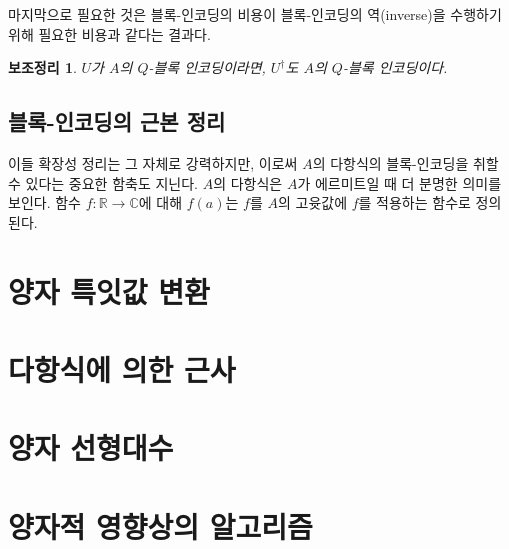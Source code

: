 \documentclass[a4paper,atbegshi,chapter,]{oblivoir}
\newtheorem{lemm}{보조정리}[chapter]
\begin{document}
마지막으로 필요한 것은 블록-인코딩의 비용이 블록-인코딩의 역(inverse)을
수행하기 위해 필요한 비용과 같다는 결과다.
\begin{lemm}
  $U$가 $A$의 $Q$-블록 인코딩이라면, $U^{\dagger}$도 $A$의 $Q$-블록 인코딩이다.
\end{lemm}
\section{블록-인코딩의 근본 정리}
이들 확장성 정리는 그 자체로 강력하지만, 이로써  $A$의 다항식의 블록-인코딩을 
취할 수 있다는 중요한 함축도 지닌다. $A$의 다항식은 $A$가 에르미트일 때 더
분명한 의미를 보인다. 함수 $f:\mathbb{R}\rightarrow\mathbb{C}$에 대해 $f(a)$는
$f$를 $A$의 고윳값에 $f$를 적용하는 함수로 정의된다. 
\chapter{양자 특잇값 변환}
\chapter{다항식에 의한 근사}
\chapter{양자 선형대수}
\chapter{양자적 영향상의 알고리즘}
\end{document}
